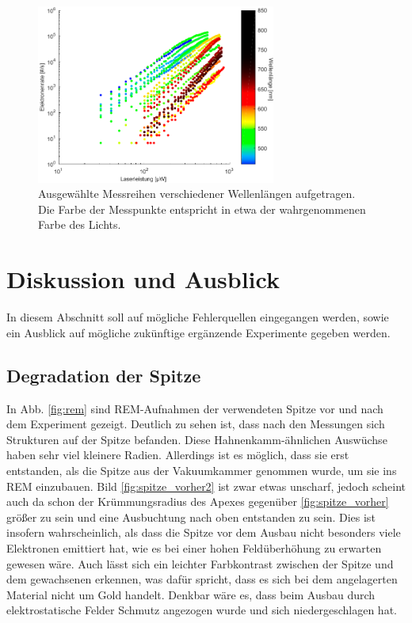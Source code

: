 \documentclass[bachelor,       %
               twoside,        %
               BCOR10mm,       %
               english,ngerman, %
               ]{GAUBM}
\begin{document}
\begin{figure}[h]
	\centering
	\includegraphics[width=0.7\textwidth]{Faecher_Daten}
	\caption{Ausgewählte Messreihen verschiedener Wellenlängen aufgetragen. Die Farbe der Messpunkte entspricht in etwa der wahrgenommenen Farbe des Lichts.}
	\label{fig:regenbogen}
\end{figure}






\chapter{Diskussion und Ausblick}
In diesem Abschnitt soll auf mögliche Fehlerquellen eingegangen werden, sowie ein Ausblick auf mögliche zukünftige ergänzende Experimente gegeben werden.
\section{Degradation der Spitze}
In Abb. \ref{fig:rem} sind REM-Aufnahmen der verwendeten Spitze vor und nach dem Experiment gezeigt.
Deutlich zu sehen ist, dass nach den Messungen sich Strukturen auf der Spitze befanden.
Diese Hahnenkamm-ähnlichen Auswüchse haben sehr viel kleinere Radien.
Allerdings ist es möglich, dass sie erst entstanden, als die Spitze aus der Vakuumkammer genommen wurde, um sie ins REM einzubauen.
Bild \ref{fig:spitze_vorher2} ist zwar etwas unscharf, jedoch scheint auch da schon der Krümmungsradius des Apexes gegenüber \ref{fig:spitze_vorher} größer zu sein und eine Ausbuchtung nach oben entstanden zu sein.
Dies ist insofern wahrscheinlich, als dass die Spitze vor dem Ausbau nicht besonders viele Elektronen emittiert hat, wie es bei einer hohen Feldüberhöhung zu erwarten gewesen wäre.
Auch lässt sich ein leichter Farbkontrast zwischen der Spitze und dem gewachsenen erkennen, was dafür spricht, dass es sich bei dem angelagerten Material nicht um Gold handelt.
Denkbar wäre es, dass beim Ausbau durch elektrostatische Felder Schmutz angezogen wurde und sich niedergeschlagen hat.
\end{document}
